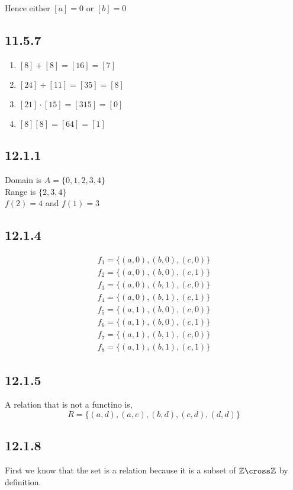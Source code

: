 \documentclass[a4paper]{report}
\begin{document}
Hence either  $[a] = 0$ or $[b] = 0$


\subsection*{11.5.7}
\begin{enumerate}
\item 
    $[8] + [8] = [16] = [7]$
\item $[24] + [11] = [35] = [8]$

\item $[21] \cdot [15] = [315] = [0]$

\item $[8][8] = [64] = [1]$

\end{enumerate}


\subsection*{12.1.1}
Domain is $A =\{0,1,2,3,4\}$\\
Range is $\{2,3,4\}$\\
 $f(2) = 4$ and $f(1) = 3$

\subsection*{12.1.4}
\begin{align*}
    f_1 = \{(a,0),(b,0),(c,0)\}\\
    f_2 = \{(a,0),(b,0),(c,1)\}\\
    f_3 = \{(a,0),(b,1),(c,0)\}\\
    f_4 = \{(a,0),(b,1),(c,1)\}\\
    f_5 = \{(a,1),(b,0),(c,0)\}\\
    f_6 = \{(a,1),(b,0),(c,1)\}\\
    f_7 = \{(a,1),(b,1),(c,0)\}\\
    f_8 = \{(a,1),(b,1),(c,1)\}
\end{align*}
 
\subsection*{12.1.5}
A relation that is not a functino is, 
$$ R = \{(a,d),(a,e),(b,d),(c,d),(d,d)\} $$ 

\subsection*{12.1.8}
First we know that the set is a relation because it is a subset of $\Z \cross \Z$ by definition.
\end{document}
